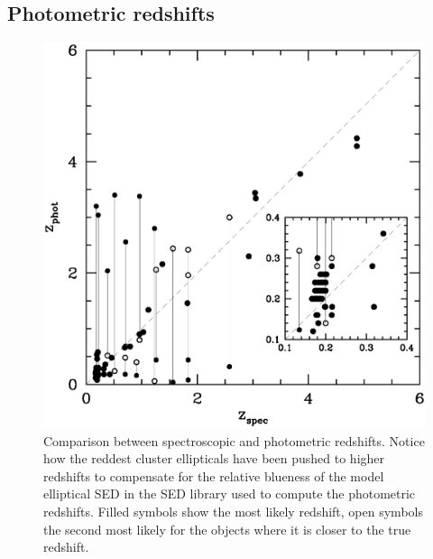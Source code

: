 \documentclass[useAMS,usenatbib]{mn2e}
\begin{document}

\subsection{Photometric redshifts}

\begin{figure}
  \centering
  \includegraphics[height=0.9\columnwidth]{figs/zcomp_b.ps}
  \caption{Comparison between spectroscopic and photometric
  redshifts. Notice how the reddest cluster ellipticals have been
  pushed to higher redshifts to compensate for the relative blueness
  of the model elliptical SED in the SED library used to compute the
  photometric redshifts. Filled symbols show the most likely redshift,
  open symbols the second most likely for the objects where it is
  closer to the true redshift.}
  \label{fig:z_spec_phot}
\end{figure}
\end{document}

